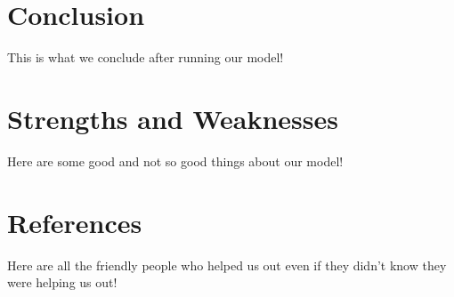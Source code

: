 \documentclass[paper.tex]{subfiles}
\begin{document}
	\section{Conclusion}
	This is what we conclude after running our model!
	
	\section{Strengths and Weaknesses}
	Here are some good and not so good things about our model!
	
	\section{References}
	Here are all the friendly people who helped us out even if they didn't know they were helping us out!
\end{document}
